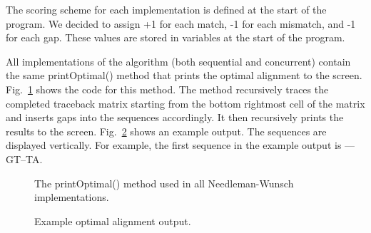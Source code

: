 \documentclass[conference]{IEEEtran}
\begin{document}
The scoring scheme for each implementation is defined at the start of the program. We decided to assign +1 for each match, -1 for each mismatch, and -1 for each gap. These values are stored in variables at the start of the program.

All implementations of the algorithm (both sequential and concurrent) contain the same printOptimal() method that prints the optimal alignment to the screen. Fig.~\ref{10} shows the code for this method. The method recursively traces the completed traceback matrix starting from the bottom rightmost cell of the matrix and inserts gaps into the sequences accordingly. It then recursively prints the results to the screen. Fig.~\ref{11} shows an example output. The sequences are displayed vertically. For example, the first sequence in the example output is ––GT–TA.

\begin{figure}[htbp]
\centerline{}
\caption{The printOptimal() method used in all Needleman-Wunsch implementations.}
\label{10}
\end{figure}

\begin{figure}[htbp]
\centerline{}
\caption{Example optimal alignment output.}
\label{11}
\end{figure}
\end{document}
